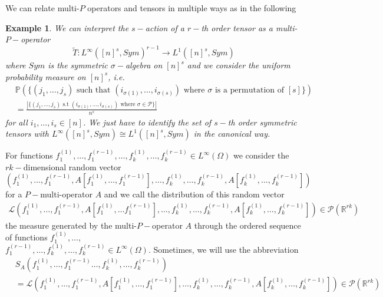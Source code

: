 \documentclass[11pt]{article}
\newtheorem{example}[theorem]{Example}
\begin{document}
We can relate multi-$P$ operators and tensors in multiple ways as in the following
\begin{example}
    We can interpret the $s-$action of a $r-$th order tensor as a multi-$P-$operator 
$$\widetilde{T}:L^{\infty}([n]^s,Sym)^{r-1}\longrightarrow L^1([n]^s,Sym)$$
where $Sym$ is the symmetric $\sigma-$algebra on $[n]^s$ and we consider the uniform probability measure on $[n]^s$, i.e.\ $$\begin{aligned}
&\mathbb{P}(\{(j_1,\ldots,j_s) \text{ such that } (i_{\sigma(1)},\ldots,i_{\sigma(s)}) \text{ where } \sigma \text{ is a permutation of $[s]$}\})\\
&=\frac{|\{(j_1,\ldots,j_s) \text{ s.t } (i_{\sigma(1)},\ldots,i_{\sigma(s)}) \text{ where } \sigma \in \mathcal{P}\}|}{n^s}
\end{aligned}$$
for all $i_1,\ldots, i_s \in [n]$. We just have to identify the set of $s-$th order symmetric tensors with $L^{\infty}([n]^s,Sym)\cong L^1([n]^s,Sym)$ in the canonical way.
\end{example}


For functions $f^{(1)}_1,\ldots, f^{(r-1)}_1,\ldots, f^{(1)}_k,\ldots,f^{(r-1)}_k \in L^{\infty}(\Omega)$ we consider the $rk-$dimensional random vector
$$
(f^{(1)}_1,\ldots, f^{(r-1)}_1,A[f^{(1)}_1,\ldots ,f^{(r-1)}_1],\ldots,f^{(1)}_k,\ldots,f^{(r-1)}_k,A[f^{(1)}_k,\ldots,f^{(r-1)}_k])
$$
for a $P-$multi-operator $A$ and we call the distribution of this random vector 
\begin{equation}
\begin{aligned}
\mathcal{L}
(f^{(1)}_1,\ldots, f^{(r-1)}_1,A[f^{(1)}_1,\ldots f^{(r-1)}_1],\ldots,f^{(1)}_k,\ldots,f^{(r-1)}_k,A[f^{(1)}_k,\ldots,f^{(r-1)}_k])
\in \mathcal{P}(\mathbb{R}^{rk})
\end{aligned}
\end{equation}
the measure generated by the multi-$P-$operator $A$ through the ordered sequence of functions $f^{(1)}_1,$$\ldots,$\\$ f^{(r-1)}_1,$$\ldots,  f^{(1)}_k,\ldots,f^{(r-1)}_k $$\in L^{\infty}(\Omega)$.
Sometimes, we will use the abbreviation 
$$
\begin{aligned}
 &S_A(f^{(1)}_1,\ldots, f^{(r-1)}_1\ldots,f^{(1)}_k,\ldots,f^{(r-1)}_k)\\ &=\mathcal{L}
(f^{(1)}_1,\ldots, f^{(r-1)}_1,A[f^{(1)}_1,\ldots, f^{(r-1)}_1],\ldots, f^{(1)}_k,\ldots,f^{(r-1)}_k,A[f^{(1)}_k,\ldots,f^{(r-1)}_k])
\in \mathcal{P}(\mathbb{R}^{rk})   
\end{aligned}
$$
\end{document}
